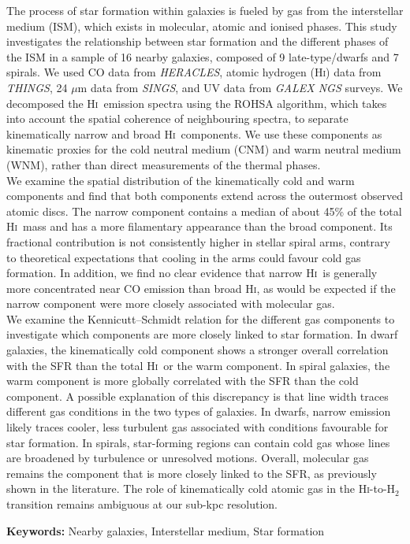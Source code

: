 \documentclass[12pt]{article}
\newcommand{\HI}{\textrm{H\textsc{i}}}
\begin{document}
The process of star formation within galaxies is fueled by gas from the interstellar medium (ISM), which exists in molecular, atomic and ionised phases. This study investigates the relationship between star formation and the different phases of the ISM in a sample of 16 nearby galaxies, composed of 9 late-type/dwarfs and 7 spirals.
We used CO data from \textit{HERACLES}, atomic hydrogen (\HI) data from \textit{THINGS}, 24 $\mu$m data from \textit{SINGS}, and UV data from \textit{GALEX NGS} surveys. We decomposed the \HI\ emission spectra using the ROHSA algorithm, which takes into account the spatial coherence of neighbouring spectra, to separate kinematically narrow and broad \HI\ components. We use these components as kinematic proxies for the cold neutral medium (CNM) and warm neutral medium (WNM), rather than direct measurements of the thermal phases.\\
We examine the spatial distribution of the kinematically cold and warm components and find that both components extend across the outermost observed atomic discs. The narrow component contains a median of about 45\% of the total \HI\ mass and has a more filamentary appearance than the broad component. Its fractional contribution is not consistently higher in stellar spiral arms, contrary to theoretical expectations that cooling in the arms could favour cold gas formation. In addition, we find no clear evidence that narrow \HI\ is generally more concentrated near CO emission than broad \HI, as would be expected if the narrow component were more closely associated with molecular gas.\\
We examine the Kennicutt--Schmidt relation for the different gas components to investigate which components are more closely linked to star formation. In dwarf galaxies, the kinematically cold component shows a stronger overall correlation with the SFR than the total \HI\ or the warm component. In spiral galaxies, the warm component is more globally correlated with the SFR than the cold component. A possible explanation of this discrepancy is that line width traces different gas conditions in the two types of galaxies. In dwarfs, narrow emission likely traces cooler, less turbulent gas associated with conditions favourable for star formation. In spirals, star-forming regions can contain cold gas whose lines are broadened by turbulence or unresolved motions. Overall, molecular gas remains the component that is more closely linked to the SFR, as previously shown in the literature. The role of kinematically cold atomic gas in the \HI-to-H$_2$ transition remains ambiguous at our sub-kpc resolution.

\vspace{2em}

\noindent
\textbf{Keywords:} 
Nearby galaxies, Interstellar medium, Star formation\\
\end{document}

